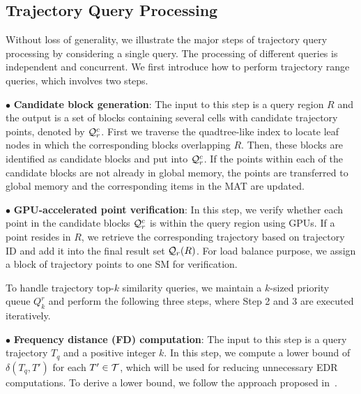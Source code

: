 \documentclass[10pt,conference,letterpaper]{IEEEtran}
\newcommand{\rangeq}{{{\cal Q}_r}\xspace}
\newcommand{\rangecand}{{{\cal Q}_r^c}\xspace}
\newcommand{\alltraj}{{{\cal T}}\xspace}
\newcommand{\edr}{{\delta}\xspace}
\newcommand{\eat}[1]{}
\begin{document}
\subsection{Trajectory Query Processing}

Without loss of generality, we illustrate the major steps of trajectory query processing by considering a single query. The processing of different queries is independent and concurrent.
We first introduce how to perform trajectory range queries, which involves two steps.

\vspace{0.1cm}$\bullet$ {\bf Candidate block generation}:
The input to this step is a query region $R$ and the output is a set of blocks containing several cells with candidate trajectory points, denoted by $\rangecand$. First we traverse the quadtree-like index to locate leaf nodes in which the corresponding blocks overlapping $R$.
Then, these blocks are identified as candidate blocks and put into $\rangecand$. If the points within each of the candidate blocks are not already in global memory, the points are transferred to global memory and the corresponding items in the MAT are updated.
\eat{
We then check if the block is already retained in global memory of the GPU. If not, the block is identified as a candidate block and put into $\rangecand$.
}

\vspace{0.1cm}$\bullet$ {\bf GPU-accelerated point verification}:
In this step, we verify whether each point in the candidate blocks $\rangecand$ is within the query region using GPUs. If a point resides in $R$, we retrieve the corresponding trajectory based on trajectory ID and add it into the final result set $\rangeq(R)$. For load balance purpose, we assign a block of trajectory points to one SM for verification.
\eat{
Each CUDA thread is responsible for several continuously stored points in the same block to increase data access throughput.
}

To handle trajectory top-$k$ similarity queries, we maintain a $k$-sized priority queue $Q_{k}^r$ and perform the following three steps, where Step 2 and 3 are executed iteratively.

\vspace{0.1cm}$\bullet$ {\bf Frequency distance (FD) computation}:
The input to this step is a query trajectory $T_q$ and a positive integer $k$.
In this step, we compute a lower bound of $\edr(T_q, T')$ for each $T'\in \alltraj$, which will be used for reducing unnecessary EDR computations. To derive a lower bound, we follow the approach proposed in~\cite{DBLP:conf/sigmod/ChenOO05}.
\end{document}
